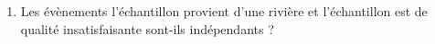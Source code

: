 \begin{enumerate}
	\begin{enumerate}
		\item Traduire la probabilité $x$ en utilisant les évènements $\overline{S}$ et $R$.
		\item Vérifier que $x = \dfrac{7}{15}$.
		\item Recopier et compléter entièrement l'arbre.
	\end{enumerate}

	\item Les évènements \og l'échantillon provient d'une rivière \fg{} et \og l'échantillon est de qualité insatisfaisante \fg{} sont-ils indépendants ?
\end{enumerate}
